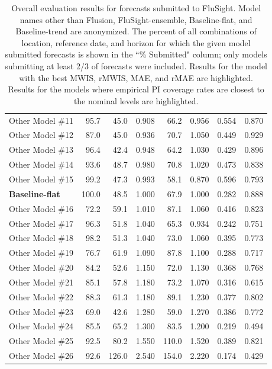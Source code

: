 \documentclass{article}\usepackage[]{graphicx}\usepackage[]{xcolor}
\begin{document}
\begin{table}[ht]
\begin{tabular}{lrrrrrrr}
  Other Model \#11 & 95.7 & 45.0 & 0.908 & 66.2 & 0.956 & 0.554 & 0.870 \\ 
  Other Model \#12 & 87.0 & 45.0 & 0.936 & 70.7 & 1.050 & 0.449 & 0.929 \\ 
  Other Model \#13 & 96.4 & 42.4 & 0.948 & 64.2 & 1.030 & 0.429 & 0.896 \\ 
  Other Model \#14 & 93.6 & 48.7 & 0.980 & 70.8 & 1.020 & 0.473 & 0.838 \\ 
  Other Model \#15 & 99.2 & 47.3 & 0.993 & 58.1 & 0.870 & 0.596 & 0.793 \\ 
  \textbf{Baseline-flat} & 100.0 & 48.5 & 1.000 & 67.9 & 1.000 & 0.282 & 0.888 \\ 
  Other Model \#16 & 72.2 & 59.1 & 1.010 & 87.1 & 1.060 & 0.416 & 0.823 \\ 
  Other Model \#17 & 96.3 & 51.8 & 1.040 & 65.3 & 0.934 & 0.242 & 0.751 \\ 
  Other Model \#18 & 98.2 & 51.3 & 1.040 & 73.0 & 1.060 & 0.395 & 0.773 \\ 
  Other Model \#19 & 76.7 & 61.9 & 1.090 & 87.8 & 1.100 & 0.288 & 0.717 \\ 
  Other Model \#20 & 84.2 & 52.6 & 1.150 & 72.0 & 1.130 & 0.368 & 0.768 \\ 
  Other Model \#21 & 85.1 & 57.8 & 1.180 & 73.2 & 1.070 & 0.316 & 0.615 \\ 
  Other Model \#22 & 88.3 & 61.3 & 1.180 & 89.1 & 1.230 & 0.377 & 0.802 \\ 
  Other Model \#23 & 69.0 & 42.6 & 1.280 & 59.0 & 1.270 & 0.386 & 0.772 \\ 
  Other Model \#24 & 85.5 & 65.2 & 1.300 & 83.5 & 1.200 & 0.219 & 0.494 \\ 
  Other Model \#25 & 92.5 & 80.2 & 1.550 & 110.0 & 1.520 & 0.389 & 0.821 \\ 
  Other Model \#26 & 92.6 & 126.0 & 2.540 & 154.0 & 2.220 & 0.174 & 0.429 \\ 
   \bottomrule
\end{tabular}
\caption{Overall evaluation results for forecasts submitted to FluSight. Model names other than Flusion, FluSight-ensemble, Baseline-flat, and Baseline-trend are anonymized. The percent of all combinations of location, reference date, and horizon for which the given model submitted forecasts is shown in the ``\% Submitted" column; only models submitting at least 2/3 of forecasts were included. Results for the model with the best MWIS, rMWIS, MAE, and rMAE are highlighted. Results for the models where empirical PI coverage rates are closest to the nominal levels are highlighted.} 
\label{tab:scores_flusight}
\end{table}
\end{document}
